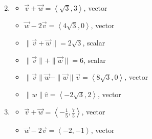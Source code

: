 \begin{enumerate}
\begin{multicols}{2}
\begin{itemize}
\end{itemize}

\end{multicols}

\item  

\begin{multicols}{2}

\begin{itemize}

\item  $\vec{v} + \vec{w} = \left<\sqrt{3},3\right> $, vector
\item  $\vec{w}  - 2\vec{v}  = \left<4\sqrt{3}, 0 \right>$, vector

\end{itemize}

\end{multicols}

\begin{multicols}{2}

\begin{itemize}

\item $\| \vec{v} + \vec{w} \| = 2\sqrt{3}$, scalar
\item  $\| \vec{v} \| + \| \vec{w}\| = 6$, scalar

\end{itemize}

\end{multicols}

\begin{multicols}{2}

\begin{itemize}

\item $\| \vec{v} \| \vec{w} - \| \vec{w} \| \vec{v}  = \left<8\sqrt{3},0\right>$, vector
\item $\|w\| \hat{v}= \left<-2\sqrt{3}, 2 \right>$, vector

\end{itemize}

\end{multicols}

\item  

\begin{multicols}{2}

\begin{itemize}

\item  $\vec{v} + \vec{w} = \left<-\frac{1}{5},\frac{7}{5}\right> $, vector
\item  $\vec{w}  - 2\vec{v}  = \left<-2, -1 \right>$, vector


\end{itemize}
\end{multicols}
\end{enumerate}
